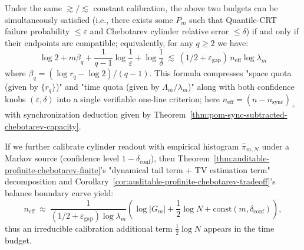 \begin{remark}\label{rem:pom-space-time-confidence-law}
Under the same $\gtrsim/\lesssim$ constant calibration, the above two budgets can be simultaneously satisfied (i.e., there exists some $P_m$ such that Quantile-CRT failure probability $\le\varepsilon$ and Chebotarev cylinder relative error $\le\delta$) if and only if their endpoints are compatible; equivalently, for any $q\ge 2$ we have:
\[
\boxed{
\log 2+m\beta_q+\frac{1}{q-1}\log\frac{1}{\varepsilon}+\log\frac{1}{\delta}
\ \lesssim\
(1/2+\varepsilon_{\mathrm{gap}})\,n_{\mathrm{eff}}\log\lambda_m
}
\]
where $\beta_q=(\log r_q-\log 2)/(q-1)$.
This formula compresses "space quota (given by $\{r_q\}$)" and "time quota (given by $\Lambda_m/\lambda_m$)" along with both confidence knobs $(\varepsilon,\delta)$ into a single verifiable one-line criterion; here $n_{\mathrm{eff}}=(n-n_{\mathrm{sync}})_+$ with synchronization deduction given by Theorem~\ref{thm:pom-sync-subtracted-chebotarev-capacity}.
\par
If we further calibrate cylinder readout with empirical histogram $\hat{\pi}_{m,N}$ under a Markov source (confidence level $1-\delta_{\mathrm{conf}}$), then Theorem~\ref{thm:auditable-profinite-chebotarev-finite}'s "dynamical tail term + TV estimation term" decomposition and Corollary~\ref{cor:auditable-profinite-chebotarev-tradeoff}'s balance boundary curve yield:
\[
n_{\mathrm{eff}}\ \approx\
\frac{1}{(1/2+\varepsilon_{\mathrm{gap}})\log\lambda_m}\left(\log|G_m|+\frac12\log N+\mathrm{const}(m,\delta_{\mathrm{conf}})\right),
\]
thus an irreducible calibration additional term $\tfrac12\log N$ appears in the time budget.
\end{remark}

